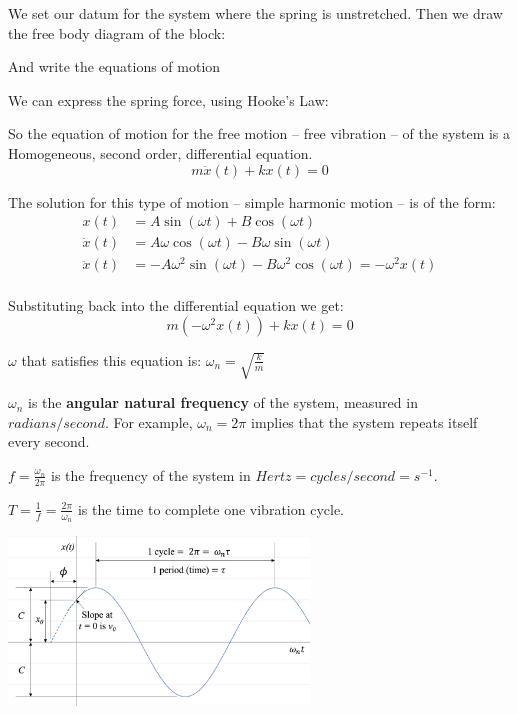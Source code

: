 \documentclass[12pt,letterpaper,twoside]{report}
\begin{document}
We set our datum for the system where the spring is unstretched.  Then we draw the free body diagram of the block:

\vspace*{8\baselineskip}

And write the equations of motion

\vspace*{4\baselineskip}

We can express the spring force, using Hooke’s Law:
\vspace*{5\baselineskip}

So the equation of motion for the free motion – free vibration – of the system is a Homogeneous, second order, differential equation.
\[
m \ddot{x} (t) + kx(t) = 0
\]

The solution for this type of motion – simple harmonic motion – is of the form:
\begin{align*}
x(t) &= A \sin (\omega t) + B \cos (\omega t)\\
\dot{x}(t) &= A \omega \cos (\omega t) - B \omega \sin (\omega t)\\
\ddot{x}(t) &= -A \omega^2 \sin (\omega t) - B \omega^2 \cos (\omega t) = - \omega^2 x(t)\\
\end{align*}

Substituting back into the differential equation we get:
\[
m (- \omega^2 x(t)) + kx(t) = 0
\]

$\omega$ that satisfies this equation is: $\displaystyle \omega_n = \sqrt{\frac{k}{m}}$

$\omega_n$ is the \textbf{angular natural frequency} of the system, measured in $radians/second$.  For example, $\omega_n = 2\pi$ implies that the system repeats itself every second.  

$\displaystyle f = \frac{\omega_n}{2\pi}$ is the frequency of the system in $Hertz = cycles/second=s^{-1}$. 

$\displaystyle T = \frac{1}{f} = \frac{2\pi}{\omega_n}$ is the time to complete one vibration cycle. 

\includegraphics[trim={0cm 0cm 0cm 0cm},clip,width=0.6\textwidth, center]{Slide75}
\end{document}
